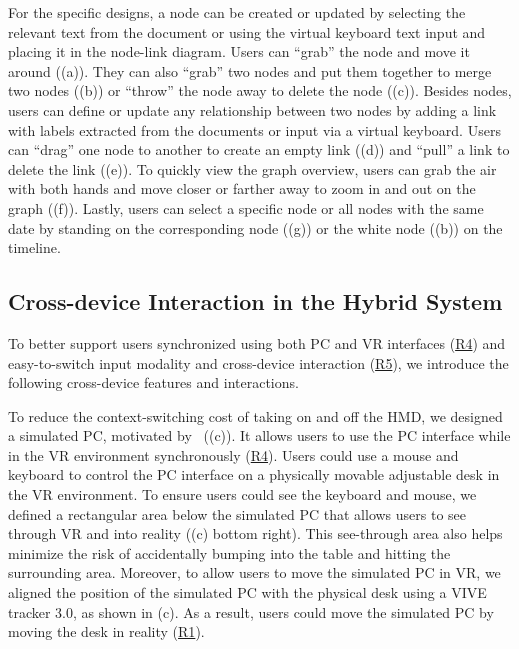  For the specific designs, a node can be created or updated by selecting the relevant text from the document or using the virtual keyboard text input and placing it in the node-link diagram. Users can ``grab'' the node and move it around ((a)). They can also ``grab'' two nodes and put them together to merge two nodes ((b)) or ``throw'' the node away to delete the node ((c)). Besides nodes, users can define or update any relationship between two nodes by adding a link with labels extracted from the documents or input via a virtual keyboard. Users can ``drag'' one node to another to create an empty link ((d)) and ``pull'' a link to delete the link ((e)). 
To quickly view the graph overview, users can grab the air with both hands and move closer or farther away to zoom in and out on the graph ((f)).
Lastly, users can select a specific node or all nodes with the same date by standing on the corresponding node ((g)) or the white node ((b)) on the timeline. 

\subsection{Cross-device Interaction in the Hybrid System}
To better support users synchronized using both PC and VR interfaces (\hyperref[req:r4]{R4}) and easy-to-switch input modality and cross-device interaction (\hyperref[req:r5]{R5}), we introduce the following cross-device features and interactions.


 To reduce the context-switching cost of taking on and off the HMD, we designed a simulated PC, motivated by~\cite{jetter2020vr,immersed2023,hubenschmid2022relive,seraji2024analyzing} ((c)). 
It allows users to use the PC interface while in the VR environment synchronously (\hyperref[req:r4]{R4}). Users could use a mouse and keyboard to control the PC interface on a physically movable adjustable desk in the VR environment. 
To ensure users could see the keyboard and mouse, we defined a rectangular area below the simulated PC that allows users to see through VR and into reality ((c) bottom right). 
This see-through area also helps minimize the risk of accidentally bumping into the table and hitting the surrounding area. 
Moreover, to allow users to move the simulated PC in VR, we aligned the position of the simulated PC with the physical desk using a VIVE tracker 3.0, as shown in (c). As a result, users could move the simulated PC by moving the desk in reality (\hyperref[req:r1]{R1}).

